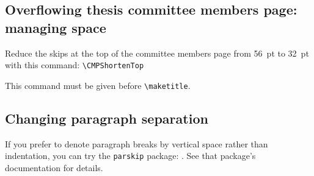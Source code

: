 \documentclass[11pt]{article}
\begin{document}
\subsection{Overflowing thesis committee members page: managing space}
Reduce the skips at the top of the committee members page from 56~pt to 32~pt with this command:
	\vskip 5pt
	\verb|\CMPShortenTop|
	\vskip 5pt
	
\noindent This command must be given before \verb|\maketitle|.

\subsection{Changing paragraph separation}
If you prefer to denote paragraph breaks by vertical space rather than indentation, you can try the \texttt{parskip} package: . See that package's documentation for details.
\end{document}
